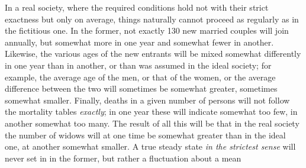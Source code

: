 In a real society, where the required conditions hold not with their strict exactness but only on average, things naturally cannot proceed as regularly as in the fictitious one. In the former, not exactly 130 new married couples will join annually, but somewhat more in one year and somewhat fewer in another. Likewise, the various ages of the new entrants will be mixed somewhat differently in one year than in another, or than was assumed in the ideal society; for example, the average age of the men, or that of the women, or the average difference between the two will sometimes be somewhat greater, sometimes somewhat smaller. Finally, deaths in a given number of persons will not follow the mortality tables \textit{exactly}; in one year these will indicate somewhat too few, in another somewhat too many. The result of all this will be that in the real society the number of widows will at one time be somewhat greater than in the ideal one, at another somewhat smaller. A true steady state \textit{in the strictest sense} will never set in in the former, but rather a fluctuation about a mean
